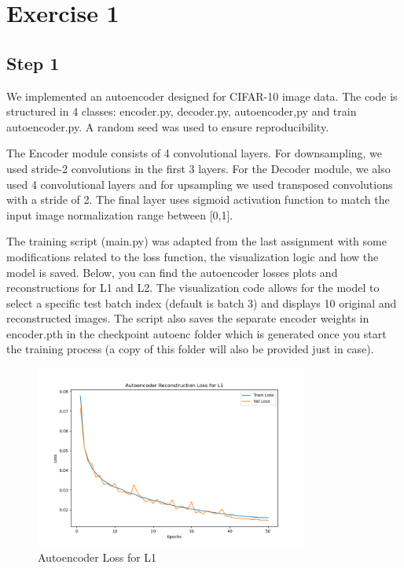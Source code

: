 

\section{Exercise 1}
\subsection{Step 1}

We implemented an autoencoder designed for CIFAR-10 image data. The code is structured in 4 classes: encoder.py, decoder.py, autoencoder,py and train autoencoder.py. A random seed was used to ensure reproducibility.

The Encoder module consists of 4 convolutional layers. For downsampling, we used stride-2 convolutions in the first 3 layers. For the Decoder module, we also used 4 convolutional layers and for upsampling we used transposed convolutions with a stride of 2. The final layer uses sigmoid activation function to match the input image normalization range between [0,1].

The training script (main.py) was adapted from the last assignment with some modifications related to the loss function, the visualization logic and how the model is saved. Below, you can find the autoencoder losses plots and reconstructions for L1 and L2. The visualization code allows for the model to select a specific test batch index (default is batch 3) and displays 10 original and reconstructed images. The script also saves the separate encoder weights in encoder.pth in the checkpoint autoenc folder which is generated once you start the training process (a copy of this folder will also be provided just in case).

\begin{figure}[H] 
    \centering
    \includegraphics[width=0.8\textwidth]{images/ex1_autoencoder_loss_l1} 
    \caption{Autoencoder Loss for L1}
\end{figure}

